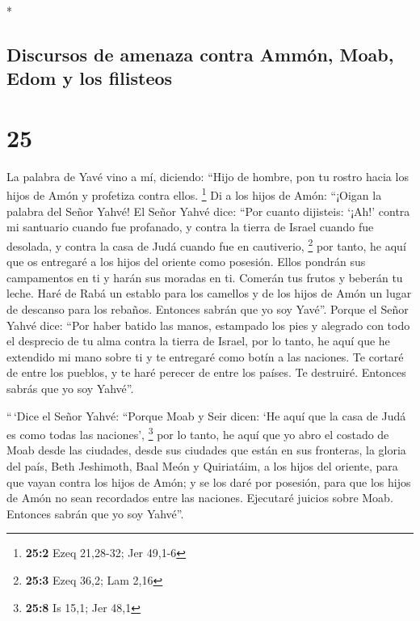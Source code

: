 \begin{paracol}{2}
\begin{otherlanguage}{english}
\end{otherlanguage}

\switchcolumn[0]*

\hypertarget{discursos-de-amenaza-contra-ammuxf3n-moab-edom-y-los-filisteos}{%
\subsection{Discursos de amenaza contra Ammón, Moab, Edom y los
filisteos}\label{discursos-de-amenaza-contra-ammuxf3n-moab-edom-y-los-filisteos}}

\hypertarget{section-48}{%
\section{25}\label{section-48}}

 La palabra de Yavé vino a mí, diciendo: 
``Hijo de hombre, pon tu rostro hacia los hijos de Amón y profetiza
contra ellos. \footnote{\textbf{25:2} Ezeq 21,28-32; Jer 49,1-6}
 Di a los hijos de Amón: ``¡Oigan la palabra del Señor
Yahvé! El Señor Yahvé dice: ``Por cuanto dijisteis: `¡Ah!' contra mi
santuario cuando fue profanado, y contra la tierra de Israel cuando fue
desolada, y contra la casa de Judá cuando fue en cautiverio, \footnote{\textbf{25:3}
  Ezeq 36,2; Lam 2,16}  por tanto, he aquí que os
entregaré a los hijos del oriente como posesión. Ellos pondrán sus
campamentos en ti y harán sus moradas en ti. Comerán tus frutos y
beberán tu leche.  Haré de Rabá un establo para los
camellos y de los hijos de Amón un lugar de descanso para los rebaños.
Entonces sabrán que yo soy Yavé''.  Porque el Señor Yahvé
dice: ``Por haber batido las manos, estampado los pies y alegrado con
todo el desprecio de tu alma contra la tierra de Israel, 
por lo tanto, he aquí que he extendido mi mano sobre ti y te entregaré
como botín a las naciones. Te cortaré de entre los pueblos, y te haré
perecer de entre los países. Te destruiré. Entonces sabrás que yo soy
Yahvé''.

 ``\,`Dice el Señor Yahvé: ``Porque Moab y Seir dicen: `He
aquí que la casa de Judá es como todas las naciones', \footnote{\textbf{25:8}
  Is 15,1; Jer 48,1}  por lo tanto, he aquí que yo abro el
costado de Moab desde las ciudades, desde sus ciudades que están en sus
fronteras, la gloria del país, Beth Jeshimoth, Baal Meón y Quiriatáim,
 a los hijos del oriente, para que vayan contra los hijos
de Amón; y se los daré por posesión, para que los hijos de Amón no sean
recordados entre las naciones.  Ejecutaré juicios sobre
Moab. Entonces sabrán que yo soy Yahvé''.


\end{paracol}
